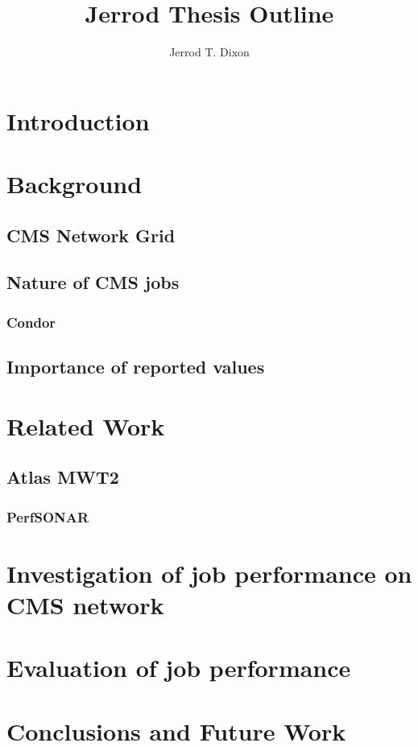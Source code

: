 \documentclass[]{article}
\title{Jerrod Thesis Outline}
\author{Jerrod T. Dixon}
\begin{document}
\maketitle

\section{Introduction}

\section{Background}
\subsection{CMS Network Grid}
\subsection{Nature of CMS jobs}
\subsubsection{Condor}
\subsection{Importance of reported values}
\section{Related Work}
\subsection{Atlas MWT2}
\subsubsection{PerfSONAR}
\section{Investigation of job performance on CMS network}

\section{Evaluation of job performance}

\section{Conclusions and Future Work}
\end{document}
